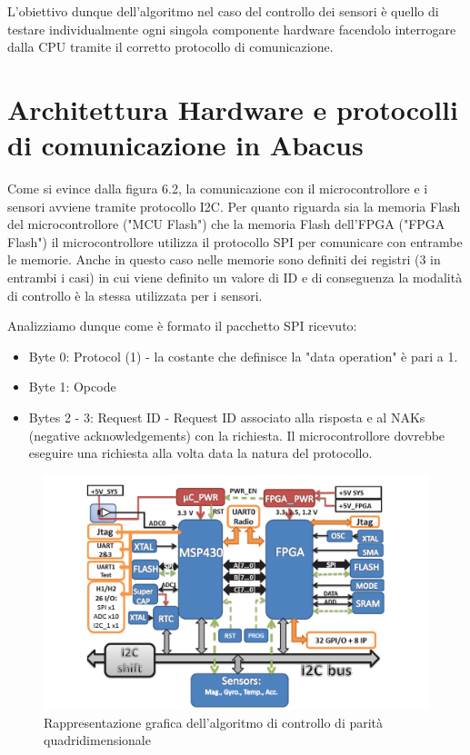 \documentclass[LaM,binding=0.6cm]{../sapthesis}
\begin{document}
L’obiettivo dunque dell’algoritmo nel caso del controllo dei sensori è quello di testare individualmente ogni singola componente hardware facendolo interrogare dalla CPU tramite il corretto protocollo di comunicazione.


\section{Architettura Hardware e protocolli di comunicazione in Abacus}

Come si evince dalla figura 6.2, la comunicazione con il microcontrollore e i sensori avviene tramite protocollo I2C.
Per quanto riguarda sia la memoria Flash del microcontrollore ("MCU Flash") che la memoria Flash dell'FPGA ("FPGA Flash") il microcontrollore utilizza il protocollo SPI per comunicare con entrambe le memorie. Anche in questo caso nelle memorie sono definiti dei registri (3 in entrambi i casi) in cui viene definito un valore di ID e di conseguenza la modalità di controllo è la stessa utilizzata per i sensori.

Analizziamo dunque come è formato il pacchetto SPI ricevuto:
\begin{itemize}
    \item Byte 0: Protocol (1) - la costante che definisce la "data  operation" è pari a 1.
    
    \item Byte 1: Opcode
    
    \item Bytes 2 - 3: Request ID - Request ID associato alla risposta e al NAKs (negative acknowledgements) con la richiesta. Il microcontrollore dovrebbe eseguire una richiesta alla volta data la natura del protocollo.
\end{itemize}
    

\begin{figure}[htbp]
\centerline{\includegraphics[scale=0.6]{examples/ABACUS_overview.png}}
\caption{Rappresentazione grafica dell'algoritmo di controllo di parità quadridimensionale}
\label{fig}
\end{figure}
\vspace{0.5cm}
\end{document}
